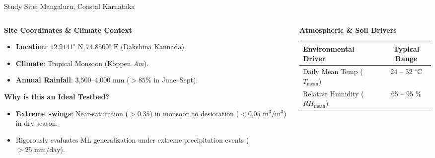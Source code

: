 \documentclass[aspectratio=169, 10pt]{beamer}
\begin{document}
\begin{frame}{Study Site: Mangaluru, Coastal Karnataka}
    \begin{columns}
        \begin{column}{0.50\textwidth}
            \begin{block}{\textbf{Site Coordinates \& Climate Context}}
                \footnotesize
                \begin{itemize}
                    \item \textbf{Location}: $12.9141^\circ\text{ N}, 74.8560^\circ\text{ E}$ (Dakshina Kannada).
                    \item \textbf{Climate}: Tropical Monsoon (Köppen \textit{Am}).
                    \item \textbf{Annual Rainfall}: 3,500--4,000 mm ($>85\%$ in June--Sept).
                \end{itemize}
            \end{block}
            \vspace{0.15cm}
            \begin{alertblock}{\textbf{Why is this an Ideal Testbed?}}
                \footnotesize
                \begin{itemize}
                    \item \textbf{Extreme swings}: Near-saturation ($>0.35$) in monsoon to desiccation ($<0.05\text{ m}^3/\text{m}^3$) in dry season.
                    \item Rigorously evaluates ML generalization under extreme precipitation events ($>25\text{ mm/day}$).
                \end{itemize}
            \end{alertblock}
        \end{column}
        \begin{column}{0.48\textwidth}
            \begin{exampleblock}{\textbf{Atmospheric \& Soil Drivers}}
                \centering
                \footnotesize
                \begin{tabular}{lc}
                    \toprule
                    \textbf{Environmental Driver} & \textbf{Typical Range} \\
                    \midrule
                    Daily Mean Temp ($T_{\text{mean}}$) & 24 -- 32 $^\circ\text{C}$ \\
                    Relative Humidity ($RH_{\text{mean}}$) & 65 -- 95 \% \\

\end{tabular}
\end{exampleblock}
\end{column}
\end{columns}
\end{frame}
\end{document}
